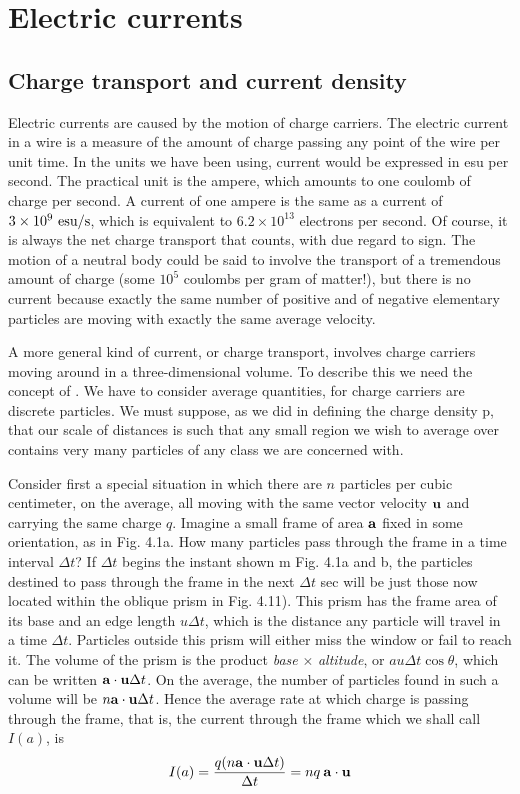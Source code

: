 \chapter{Electric currents}

\section{Charge transport and current density}

Electric currents are caused by the motion of charge carriers. The
electric current in a wire is a measure of the amount of charge passing
any point of the wire per unit time. In the units we have been
using, current would be expressed in esu per second. The practical
unit is the ampere, which amounts to one coulomb of charge per
second. A current of one ampere is the same as a current of
$3 \times 10^9\ \textup{esu}/\textup{s}$, which is equivalent to $6.2 \times 10^{13}$ electrons per
second. Of course, it is always the net charge transport that counts,
with due regard to sign. The motion of a neutral body could be said
to involve the transport of a tremendous amount of charge (some
$10^5$ coulombs per gram of matter!), but there is no current because
exactly the same number of positive and of negative elementary
particles are moving with exactly the same average velocity.

A more general kind of current, or charge transport, involves
charge carriers moving around in a three-dimensional volume. To
describe this we need the concept of . We have to
consider average quantities, for charge carriers are discrete particles.
We must suppose, as we did in defining the charge density p, that
our scale of distances is such that any small region we wish to average
over contains very many particles of any class we are concerned
with.

Consider first a special situation in which there are $n$ particles
per cubic centimeter, on the average, all moving with the same vector
velocity $\mathbf{u}$ and carrying the same charge $q$. Imagine a small frame
of area $\mathbf{a}$ fixed in some orientation, as in Fig. 4.1a. How many particles
pass through the frame in a time interval $\Delta t$? If $\Delta t$ begins the
instant shown m Fig. 4.1a and b, the particles destined to pass
through the frame in the next $\Delta t$ sec will be just those now located
within the oblique prism in Fig. 4.11). This prism has the frame area
of its base and an edge length $u \Delta t$, which is the distance any particle
will travel in a time $\Delta t$. Particles outside this prism will either miss
the window or fail to reach it. The volume of the prism is the product
\emph{base} $\times$ \emph{altitude}, or $au \Delta t \cos \theta$, which can be written
$\mathbf{a}\cdot\mathbf{u} \Delta t$. On
the average, the number of particles found in such a volume will be
$n\mathbf{a}\cdot\mathbf{u} \Delta t$. Hence the average rate at which charge is passing through
the frame, that is, the current through the frame which we shall call
$I(a)$, is
\begin{equation}
  I(a) = \frac{q(n\mathbf{a}\cdot\mathbf{u} \Delta t)}{\Delta t} = nq\:\mathbf{a}\cdot\mathbf{u}
\end{equation}

